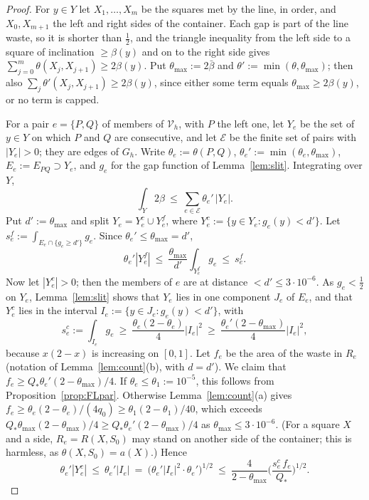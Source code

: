 \documentclass[11pt]{amsart}
\theoremstyle{definition}
\theoremstyle{remark}
\begin{document}
\begin{proof}
For $y\in Y$ let $X_1,\dots,X_m$ be the squares met by the line, in order, and $X_0,X_{m+1}$ the left and right sides of
the container. Each gap is part of the line waste, so it is shorter than $\frac12$, and the triangle
inequality from the left side to a square of inclination $\ge\beta(y)$ and on to the right side gives
$\sum_{j=0}^m\theta(X_j,X_{j+1})\ge2\beta(y)$. Put $\theta_{\max}:=2\bar\beta$ and $\theta':=\min(\theta,\theta_{\max})$; then also
$\sum_j\theta'(X_j,X_{j+1})\ge2\beta(y)$, since either some term equals $\theta_{\max}\ge2\beta(y)$, or no term is capped.

For a pair $e=\{P,Q\}$ of members of $\mathcal V_h$, with $P$ the left one,
let $Y_e$ be the set of $y\in Y$ on which $P$ and $Q$ are consecutive, and let $\mathcal E$ be the finite set of pairs with
$|Y_e|>0$; they are edges of $G_h$. Write $\theta_e:=\theta(P,Q)$, $\theta_e':=\min(\theta_e,\theta_{\max})$, $E_e:=E_{PQ}\supset Y_e$, and
$g_e$ for the gap function of Lemma~\ref{lem:slit}. Integrating over $Y$,
\[
\int_Y2\beta\ \le\ \sum_{e\in\mathcal E}\theta_e'\,|Y_e| .
\]
Put $d':=\theta_{\max}$ and split $Y_e=Y_e^c\cup Y_e^f$, where $Y_e^c:=\{y\in Y_e:g_e(y)<d'\}$. Let
$s_e^f:=\int_{E_e\cap\{g_e\ge d'\}}g_e$. Since $\theta_e'\le\theta_{\max}=d'$,
\[
\theta_e'|Y_e^f|\ \le\ \frac{\theta_{\max}}{d'}\int_{Y_e^f}g_e\ \le\ s_e^f .
\]
Now let $|Y_e^c|>0$; then the members of $e$ are at distance $<d'\le3\cdot10^{-6}$. As $g_e<\frac12$ on $Y_e$, Lemma~\ref{lem:slit}
shows that $Y_e$ lies in one component $J_e$ of $E_e$, and that $Y_e^c$ lies in the interval $I_e:=\{y\in J_e:g_e(y)<d'\}$, with
\[
s_e^c:=\int_{I_e}g_e\ \ge\ \frac{\theta_e(2-\theta_e)}4|I_e|^2\ \ge\ \frac{\theta_e'(2-\theta_{\max})}4|I_e|^2 ,
\]
because $x(2-x)$ is increasing on $[0,1]$. Let $f_e$ be the area of the waste in $R_e$ (notation of
Lemma~\ref{lem:count}(b), with $d=d'$). We claim that $f_e\ge Q_*\theta_e'(2-\theta_{\max})/4$. If $\theta_e\le\theta_1:=10^{-5}$, this
follows from Proposition~\ref{prop:FLpar}. Otherwise Lemma~\ref{lem:count}(a) gives
$f_e\ge\theta_e(2-\theta_e)/(4q_0)\ge\theta_1(2-\theta_1)/40$, which exceeds $Q_*\theta_{\max}(2-\theta_{\max})/4\ge Q_*\theta_e'(2-\theta_{\max})/4$ as
$\theta_{\max}\le3\cdot10^{-6}$. (For a square $X$ and a side, $R_e=R(X,S_0)$ may stand on another side of the container; this is
harmless, as $\theta(X,S_0)=a(X)$.) Hence
\[
\theta_e'|Y_e^c|\ \le\ \theta_e'|I_e|\ =\ \big(\theta_e'|I_e|^2\cdot\theta_e'\big)^{1/2}\ \le\ \frac4{2-\theta_{\max}}\Big(\frac{s_e^c\,f_e}{Q_*}\Big)^{1/2}.
\]
\end{proof}
\end{document}
